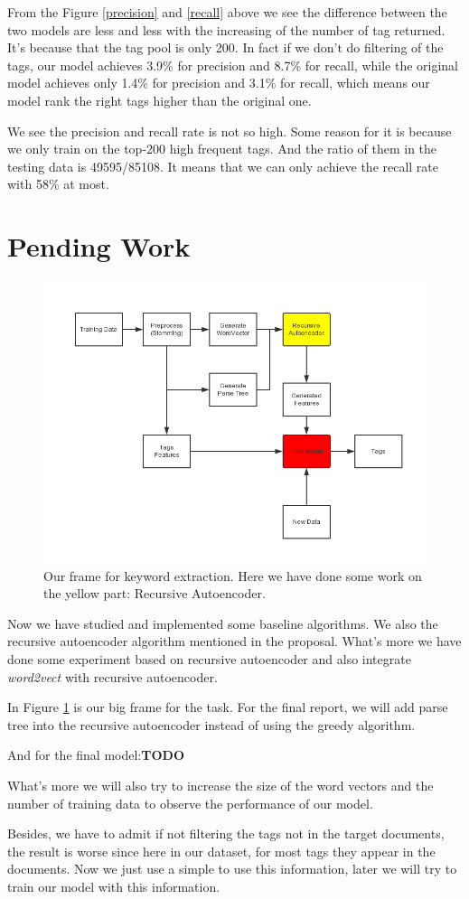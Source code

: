 \documentclass[dvips,12pt]{article}
\begin{document}
        From the Figure \ref{precision} and \ref{recall} above we see the difference between the two models are less and less with the increasing of the number of tag returned. It's because that the tag pool is only 200. In fact if we don't do filtering of the tags, our model achieves 3.9\% for precision and 8.7\% for recall, while the original model achieves only 1.4\% for precision and 3.1\% for recall, which means our model rank the right tags higher than the original one.
        
        We see the precision and recall rate is not so high. Some reason for it is because we only train on the top-200 high frequent tags. And the ratio of them in the testing data is 49595/85108. It means that we can only achieve the recall rate with 58\% at most.
	\section{Pending Work}
    \begin{figure}
        \includegraphics[scale=0.6]{DataFlow.png}
        \caption{Our frame for keyword extraction. Here we have done some work on the yellow part: Recursive Autoencoder.}
        \label{frame}
    \end{figure}
    Now we have studied and implemented some baseline algorithms. We also the recursive autoencoder algorithm mentioned in the proposal. What's more we have done some experiment based on recursive autoencoder and also integrate \emph{word2vect} with recursive autoencoder.
    
    In Figure \ref{frame} is our big frame for the task. For the final report, we will add parse tree into the recursive autoencoder instead of using the greedy algorithm.
    
    And for the final model:\textbf{TODO}
    
    What's more we will also try to increase the size of the word vectors and the number of training data to observe the performance of our model.
    
    Besides, we have to admit if not filtering the tags not in the target documents, the result is worse since here in our dataset, for most tags they appear in the documents. Now we just use a simple to use this information, later we will try to train our model with this information.
	
	
\end{document}
